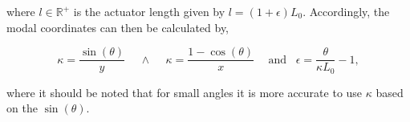 where $l \in \mathbb{R}^{+}$ is the actuator length given by $l = (1+\epsilon)L_0$. Accordingly, the modal coordinates can then be calculated by,

\begin{equation}
    \kappa = \frac{\sin(\theta)}{y} \hspace{15pt} 	\land \hspace{15pt}  \kappa = \frac{1 -\cos(\theta)}{x} \hspace{15pt} \text{and} \hspace{10pt} \epsilon = \frac{\theta}{\kappa L_0} -1,
\end{equation}

where it should be noted that for small angles it is more accurate to use $\kappa$ based on the $\sin(\theta)$.


